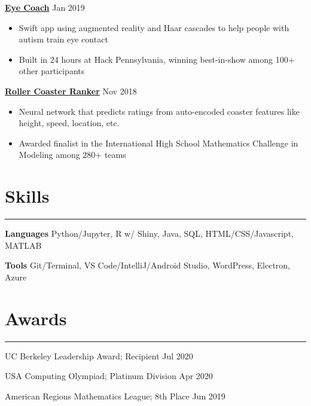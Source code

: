 \documentclass[11pt]{article}
\newcommand{\resumesection}[1]{\vspace{-0.3cm}\section*{\color{highlight}#1}\vspace{-0.3cm}\hrule\vspace{0.3cm}}
\begin{document}
\textbf{\href{https://github.com/gautomdas/eye-coach}{Eye Coach}} \hfill Jan 2019 \par

\begin{itemize}
	\item Swift app using augmented reality and Haar cascades to help people with autism train eye contact
	\item Built in 24 hours at Hack Pennsylvania, winning best-in-show among 100+ other participants
\end{itemize}\vspace{0.1cm} \par

\textbf{\href{https://github.com/prayaggordy/HiMCM}{Roller Coaster Ranker}}  \hfill Nov 2018\par

\begin{itemize}
	\item Neural network that predicts ratings from auto-encoded coaster features like height, speed, location, etc.
	\item Awarded finalist in the International High School Mathematics Challenge in Modeling among 280+ teams
\end{itemize}\par

\resumesection{Skills}

\textbf{Languages} Python/Jupyter, R w/ Shiny, Java, SQL, HTML/CSS/Javascript, MATLAB\par
\textbf{Tools} Git/Terminal, VS Code/IntelliJ/Android Studio, WordPress, Electron, Azure

\resumesection{Awards}

UC Berkeley Leadership Award; Recipient \hfill Jul 2020 \par
USA Computing Olympiad; Platinum Division \hfill Apr 2020 \par
American Regions Mathematics League; 8th Place \hfill Jun 2019 \par
\end{document}
